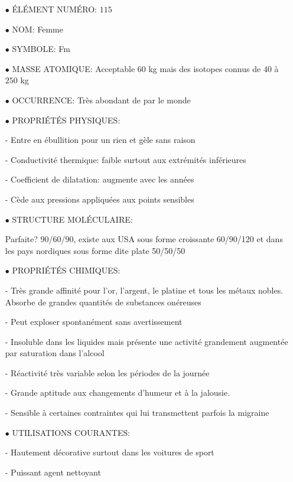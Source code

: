 \begin{itemize}
	\item[$\bullet$] ÉLÉMENT NUMÉRO: $115$

	\item[$\bullet$] NOM: Femme

	\item[$\bullet$] SYMBOLE: Fm

	\item[$\bullet$] MASSE ATOMIQUE: Acceptable 60 kg mais des isotopes connus de $40$ à $250$ kg

	\item[$\bullet$] OCCURRENCE: Très abondant de par le monde

	\item[$\bullet$] PROPRIÉTÉS PHYSIQUES:

- Entre en ébullition pour un rien et gèle sans raison

- Conductivité thermique: faible surtout aux extrémités inférieures

- Coefficient de dilatation: augmente avec les années

- Cède aux pressions appliquées aux points sensibles

	\item[$\bullet$] STRUCTURE MOLÉCULAIRE:

Parfaite? 90/60/90, existe aux USA sous forme croissante 60/90/120 et dans les pays nordiques sous forme dite plate 50/50/50

	\item[$\bullet$] PROPRIÉTÉS CHIMIQUES:

- Très grande affinité pour l'or, l'argent, le platine et tous les métaux nobles. Absorbe de grandes quantités de substances onéreuses

- Peut exploser spontanément sans avertissement

- Insoluble dans les liquides mais présente une activité grandement augmentée par saturation dans l'alcool

- Réactivité très variable selon les périodes de la journée

- Grande aptitude aux changements d'humeur et à la jalousie.

- Sensible à certaines contraintes qui lui transmettent parfois la migraine

	\item[$\bullet$] UTILISATIONS COURANTES:

- Hautement décorative surtout dans les voitures de sport

- Puissant agent nettoyant


\end{itemize}
